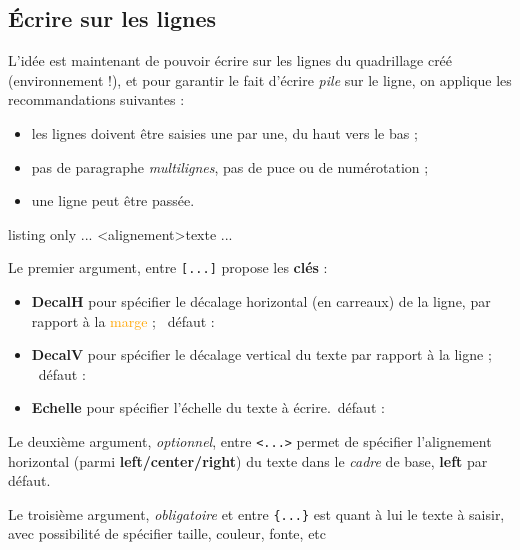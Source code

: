 \documentclass[a4paper]{article}
\newcommand\Cle[1]{{\bfseries\sffamily\textlangle #1\textrangle}}
\begin{document}
\pagebreak

\subsection{Écrire sur les lignes}

L'idée est maintenant de pouvoir écrire sur les lignes du quadrillage créé (environnement !), et pour garantir le fait d'écrire \textit{pile} sur le ligne, on applique les recommandations suivantes :

\begin{itemize}
	\item les lignes doivent être saisies une par une, du \og haut \fg{} vers le \og bas \fg{} ;
	\item pas de paragraphe \textit{multilignes}, pas de puce ou de numérotation ;
	\item une ligne peut être passée.
\end{itemize}

\begin{PresentationCode}{listing only}
...
	\EcrireLigne[clés]<alignement>{texte}
	\PasseLigne
...
\end{PresentationCode}

Le premier argument, entre \texttt{[...]} propose les \Cle{clés} :

\begin{itemize}
	\item \Cle{DecalH} pour spécifier le décalage horizontal (en carreaux) de la ligne, par rapport à la \textcolor{orange}{marge} ; \hfill~défaut : \Cle{0}
	\item \Cle{DecalV} pour spécifier le décalage vertical du texte par rapport à la ligne ; \hfill~défaut : \Cle{0pt}
	\item \Cle{Echelle} pour spécifier l'échelle du texte à écrire.\hfill~défaut : \Cle{1}
\end{itemize}

Le deuxième argument, \textit{optionnel}, entre \texttt{<...>} permet de spécifier l'alignement horizontal (parmi \Cle{left/center/right}) du texte dans le \textcolor{green!50!black}{\textit{cadre}} de base, \Cle{left} par défaut.

\medskip

Le troisième argument, \textit{obligatoire} et entre \texttt{\{...\}} est quant à lui le texte à saisir, avec possibilité de spécifier taille, couleur, fonte, etc
\end{document}
